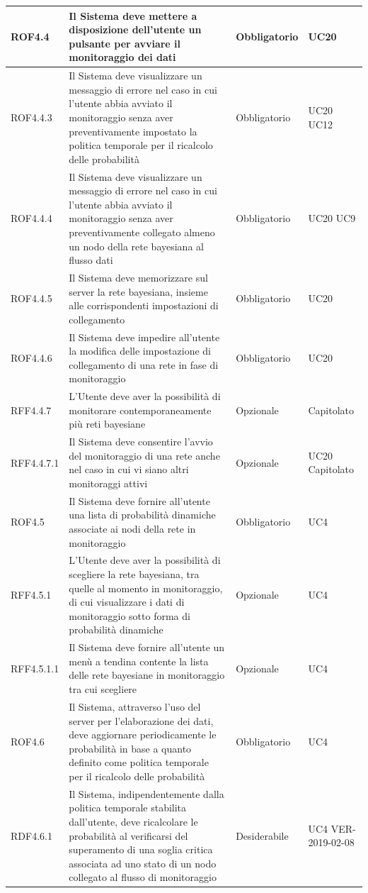 \begin{center}
\begin{longtable}[c]{|m{}|m{}|m{}|m{}|}
\hline
ROF4.4 & Il Sistema deve mettere a disposizione dell'utente un pulsante per avviare il monitoraggio dei dati & Obbligatorio & UC20\\
\hline
\rowcolor{grigio}ROF4.4.3 & Il Sistema deve visualizzare un messaggio di errore nel caso in cui l'utente abbia avviato il monitoraggio senza aver preventivamente impostato la politica temporale per il ricalcolo delle probabilità & Obbligatorio & UC20 UC12\\
\hline
ROF4.4.4 & Il Sistema deve visualizzare un messaggio di errore nel caso in cui l'utente abbia avviato il monitoraggio senza aver preventivamente collegato almeno un nodo della rete bayesiana al flusso dati & Obbligatorio & UC20 UC9\\
\hline
ROF4.4.5 & Il Sistema deve memorizzare sul server la rete bayesiana, insieme alle corrispondenti impostazioni di collegamento & Obbligatorio & UC20\\
\hline
ROF4.4.6 & Il Sistema deve impedire all'utente la modifica delle impostazione di collegamento di una rete in fase di monitoraggio & Obbligatorio & UC20\\
\hline
RFF4.4.7 & L'Utente deve aver la possibilità di monitorare contemporaneamente più reti bayesiane & Opzionale & Capitolato\\
\hline
RFF4.4.7.1 & Il Sistema deve consentire l'avvio del monitoraggio di una rete anche nel caso in cui vi siano altri monitoraggi attivi & Opzionale & UC20 Capitolato\\
\hline
ROF4.5 & Il Sistema deve fornire all'utente una lista di probabilità dinamiche associate ai nodi della rete in monitoraggio & Obbligatorio & UC4\\
\hline
RFF4.5.1 & L'Utente deve aver la possibilità di scegliere la rete bayesiana, tra quelle al momento in monitoraggio, di cui visualizzare i dati di monitoraggio sotto forma di probabilità dinamiche & Opzionale & UC4\\
\hline
RFF4.5.1.1 & Il Sistema deve fornire all'utente un menù a tendina contente la lista delle rete bayesiane in monitoraggio tra cui scegliere & Opzionale & UC4\\
\hline
\rowcolor{grigio}ROF4.6 & Il Sistema, attraverso l'uso del server per l'elaborazione dei dati, deve aggiornare periodicamente le probabilità in base a quanto definito come politica temporale per il ricalcolo delle probabilità & Obbligatorio & UC4\\
\hline
RDF4.6.1 & Il Sistema, indipendentemente dalla politica temporale stabilita dall'utente, deve ricalcolare le probabilità al verificarsi del superamento di una soglia critica associata ad uno stato di un nodo collegato al flusso di monitoraggio & Desiderabile & UC4 VER-2019-02-08\\

\end{longtable}
\end{center}
